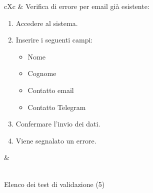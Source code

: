 \begin{table}[H]
\begin{VTtable}[1.7]{\textwidth}{cXc}
        \addtotv & Verifica di errore per email già esistente:
		\begin{enumerate}
			\item Accedere al sistema.
            \item Inserire i seguenti campi:
                \begin{itemize}
                    \item Nome
                    \item Cognome
                    \item Contatto email
                    \item Contatto Telegram
                \end{itemize}
            \item Confermare l'invio dei dati.
            \item Viene segnalato un errore.
		\end{enumerate}
		& \TNI \\
        \bottomrule\\
	\end{VTtable}
	\caption{Elenco dei test di validazione (5)}
\end{table}
